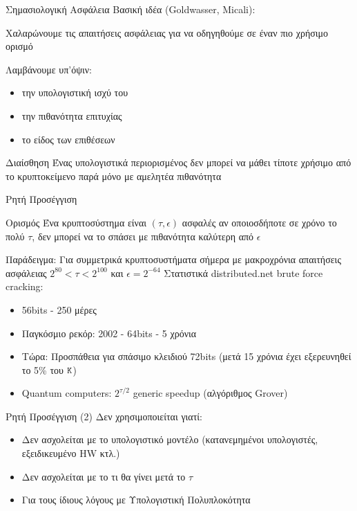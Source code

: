 \documentclass[handout]{beamer}
\begin{document}
\begin{frame}{Σημασιολογική Ασφάλεια}
Βασική ιδέα (Goldwasser, Micali): 

Χαλαρώνουμε τις απαιτήσεις ασφάλειας για να οδηγηθούμε σε έναν πιο χρήσιμο ορισμό

\pause
Λαμβάνουμε υπ'όψιν:

\begin{itemize}
	\item την υπολογιστική ισχύ του \adv
	\item την πιθανότητα επιτυχίας
	\item το είδος των επιθέσεων
\end{itemize}

\pause
\begin{block}{Διαίσθηση}
Ένας υπολογιστικά περιορισμένος \adv  δεν μπορεί να μάθει τίποτε χρήσιμο από το κρυπτοκείμενο παρά μόνο με αμελητέα πιθανότητα
\end{block}
\end{frame}

\begin{frame}{Ρητή Προσέγγιση}

\begin{block}{Ορισμός}
Ένα κρυπτοσύστημα είναι $(\tau,\epsilon)$ ασφαλές αν οποιοσδήποτε \adv σε χρόνο το πολύ $\tau$, δεν μπορεί να το σπάσει με πιθανότητα καλύτερη από $\epsilon$ 
\end{block}

\pause

Παράδειγμα: Για συμμετρικά κρυπτοσυστήματα σήμερα με μακροχρόνια απαιτήσεις ασφάλειας $2^{80} < \tau < 2^{100}$ και $\epsilon=2^{-64}$
Στατιστικά distributed.net brute force cracking:
\begin{itemize}
	\item 56bits - 250 μέρες 
	\item Παγκόσμιο ρεκόρ: 2002 - 64bits -  5 χρόνια
	\item Τώρα: Προσπάθεια για σπάσιμο κλειδιού 72bits (μετά 15 χρόνια έχει εξερευνηθεί το 5\% του $\mathtt{K}$)
	\item Quantum computers: $2^{\tau/2}$ generic speedup (αλγόριθμος Grover)
\end{itemize}
\end{frame}

\begin{frame}{Ρητή Προσέγγιση (2)}
\alert{Δεν χρησιμοποιείται} γιατί: \pause

\begin{itemize}
\item Δεν ασχολείται με το υπολογιστικό μοντέλο (κατανεμημένοι υπολογιστές, εξειδικευμένο HW κτλ.)
\item Δεν ασχολείται με το τι θα γίνει μετά το $\tau$
\item Για τους ίδιους λόγους με Υπολογιστική Πολυπλοκότητα
\end{itemize}
\end{frame}
\end{document}
